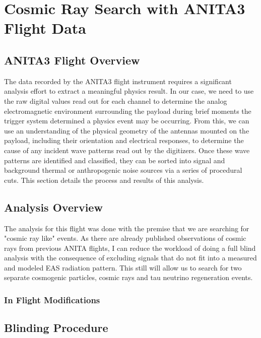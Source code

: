 \chapter{Cosmic Ray Search with ANITA3 Flight Data}
\section{ANITA3 Flight Overview}
	The data recorded by the ANITA3 flight instrument requires a significant analysis effort to extract a meaningful physics result.  In our case, we need to use the raw digital values read out for each channel to determine the analog electromagnetic environment surrounding the payload during brief moments the trigger system determined a physics event may be occurring.  From this, we can use an understanding of the physical geometry of the antennas mounted on the payload, including their orientation and electrical responses, to determine the cause of any incident wave patterns read out by the digitizers.  Once these wave patterns are identified and classified, they can be sorted into signal and background thermal or anthropogenic noise sources via a series of procedural cuts.  This section details the process and results of this analysis.
	
\section{Analysis Overview}
	The analysis for this flight was done with the premise that we are searching for "cosmic ray like" events.  As there are already published observations of cosmic rays from previous ANITA flights, I can reduce the workload of doing a full blind analysis with the consequence of excluding signals that do not fit into a measured and modeled EAS radiation pattern.  This still will allow us to search for two separate cosmogenic particles, cosmic rays and tau neutrino regeneration events.

	\subsection{In Flight Modifications}
		
	
\section{Blinding Procedure}

